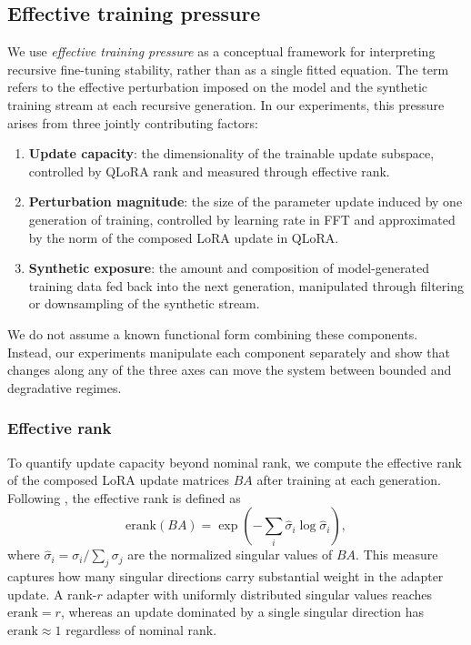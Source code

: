 \documentclass[a4paper,fleqn]{cas-dc}
\begin{document}
\subsection{Effective training pressure}\label{sec:pressure}

We use \textit{effective training pressure} as a conceptual framework for
interpreting recursive fine-tuning stability, rather than as a single fitted
equation. The term refers to the effective perturbation imposed on the model and
the synthetic training stream at each recursive generation. In our experiments,
this pressure arises from three jointly contributing factors:

\begin{enumerate}
    \item \textbf{Update capacity}: the dimensionality of the trainable update
    subspace, controlled by QLoRA rank and measured through effective rank.

    \item \textbf{Perturbation magnitude}: the size of the parameter update
    induced by one generation of training, controlled by learning rate in FFT and
    approximated by the norm of the composed LoRA update in QLoRA.

    \item \textbf{Synthetic exposure}: the amount and composition of
    model-generated training data fed back into the next generation, manipulated
    through filtering or downsampling of the synthetic stream.
\end{enumerate}

We do not assume a known functional form combining these components. Instead,
our experiments manipulate each component separately and show that changes along
any of the three axes can move the system between bounded and degradative
regimes.

\subsubsection{Effective rank}\label{sec:erank}
To quantify update capacity beyond nominal rank, we compute the effective rank
of the composed LoRA update matrices $BA$ after training at each generation.
Following \citet{roy2007}, the effective rank is defined as
\begin{equation}\label{eq:erank}
    \mathrm{erank}(BA) =
    \exp\!\left(-\sum_i \hat{\sigma}_i \log \hat{\sigma}_i\right),
\end{equation}
where $\hat{\sigma}_i = \sigma_i / \sum_j \sigma_j$ are the normalized singular
values of $BA$. This measure captures how many singular directions carry
substantial weight in the adapter update. A rank-$r$ adapter with uniformly
distributed singular values reaches $\mathrm{erank}=r$, whereas an update
dominated by a single singular direction has $\mathrm{erank}\approx 1$ regardless
of nominal rank.
\end{document}
